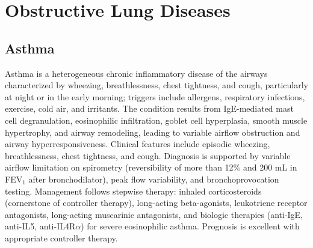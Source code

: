 \section{Obstructive Lung Diseases}








\label{sec:Obstructive Lung Diseases}

\subsection{Asthma}
\label{sec:Asthma}
Asthma is a heterogeneous chronic inflammatory disease of the airways characterized by wheezing, breathlessness, chest tightness, and cough, particularly at night or in the early morning; triggers include allergens, respiratory infections, exercise, cold air, and irritants. The condition results from IgE-mediated mast cell degranulation, eosinophilic infiltration, goblet cell hyperplasia, smooth muscle hypertrophy, and airway remodeling, leading to variable airflow obstruction and airway hyperresponsiveness. Clinical features include episodic wheezing, breathlessness, chest tightness, and cough. Diagnosis is supported by variable airflow limitation on spirometry (reversibility of more than 12\% and 200 mL in FEV$_1$ after bronchodilator), peak flow variability, and bronchoprovocation testing. Management follows stepwise therapy: inhaled corticosteroids (cornerstone of controller therapy), long-acting beta-agonists, leukotriene receptor antagonists, long-acting muscarinic antagonists, and biologic therapies (anti-IgE, anti-IL5, anti-IL4R$\alpha$) for severe eosinophilic asthma. Prognosis is excellent with appropriate controller therapy.

